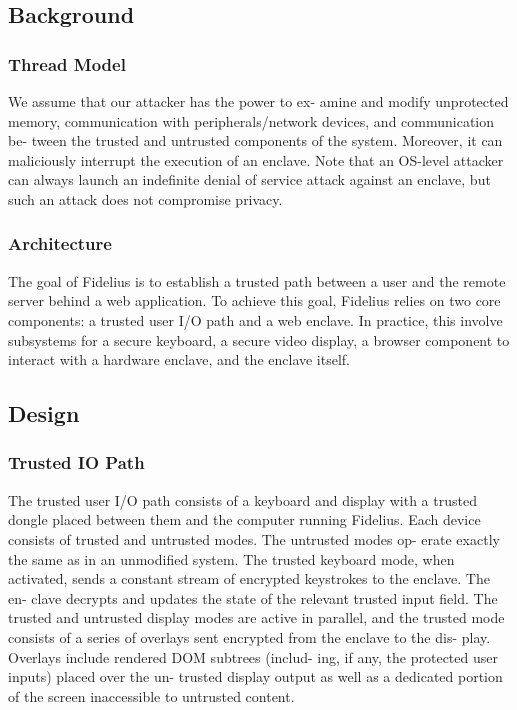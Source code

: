 \documentclass{article}
\begin{document}
\subsection{Background}

\subsubsection{Thread Model}

We assume that our attacker has the power to ex-
amine and modify unprotected memory, communication
with peripherals/network devices, and communication be-
tween the trusted and untrusted components of the system.
Moreover, it can maliciously interrupt the execution of an
enclave. Note that an OS-level attacker can always launch
an indefinite denial of service attack against an enclave,
but such an attack does not compromise privacy.

\subsubsection{Architecture}

The goal of Fidelius is to establish a trusted path between a user and the remote server behind a web application. To achieve this goal, Fidelius relies on two core components: a trusted user I/O path and a web enclave. In practice, this involve subsystems for a secure keyboard, a secure video display, a browser component to interact with a hardware enclave, and the enclave itself.

\subsection{Design}

\subsubsection{Trusted IO Path}

The trusted user I/O path consists of a keyboard and
display with a trusted dongle placed between them and
the computer running Fidelius. Each device consists of
trusted and untrusted modes. The untrusted modes op-
erate exactly the same as in an unmodified system. The
trusted keyboard mode, when activated, sends a constant
stream of encrypted keystrokes to the enclave. The en-
clave decrypts and updates the state of the relevant trusted
input field. The trusted and untrusted display modes are
active in parallel, and the trusted mode consists of a series
of overlays sent encrypted from the enclave to the dis-
play. Overlays include rendered DOM subtrees (includ-
ing, if any, the protected user inputs) placed over the un-
trusted display output as well as a dedicated portion of the
screen inaccessible to untrusted content.
\end{document}
